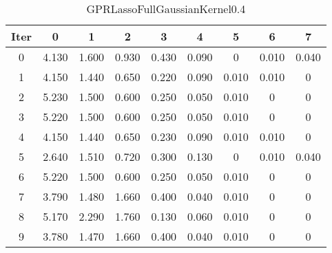 \begin{table}
	\begin{center}
		\begin{tabular}{|c|c|c|c|c|c|c|c|c|}
			\hline
			Iter & 0 & 1 & 2 & 3 & 4 & 5 & 6 & 7 \\
			\hline
			0 & 4.130 & 1.600 & 0.930 & 0.430 & 0.090 & 0 & 0.010 & 0.040 \\
			\hline
			1 & 4.150 & 1.440 & 0.650 & 0.220 & 0.090 & 0.010 & 0.010 & 0 \\
			\hline
			2 & 5.230 & 1.500 & 0.600 & 0.250 & 0.050 & 0.010 & 0 & 0 \\
			\hline
			3 & 5.220 & 1.500 & 0.600 & 0.250 & 0.050 & 0.010 & 0 & 0 \\
			\hline
			4 & 4.150 & 1.440 & 0.650 & 0.230 & 0.090 & 0.010 & 0.010 & 0 \\
			\hline
			5 & 2.640 & 1.510 & 0.720 & 0.300 & 0.130 & 0 & 0.010 & 0.040 \\
			\hline
			6 & 5.220 & 1.500 & 0.600 & 0.250 & 0.050 & 0.010 & 0 & 0 \\
			\hline
			7 & 3.790 & 1.480 & 1.660 & 0.400 & 0.040 & 0.010 & 0 & 0 \\
			\hline
			8 & 5.170 & 2.290 & 1.760 & 0.130 & 0.060 & 0.010 & 0 & 0 \\
			\hline
			9 & 3.780 & 1.470 & 1.660 & 0.400 & 0.040 & 0.010 & 0 & 0 \\
			\hline
		\end{tabular}
	\end{center}
	\caption{GPRLassoFullGaussianKernel0.4}
\end{table}